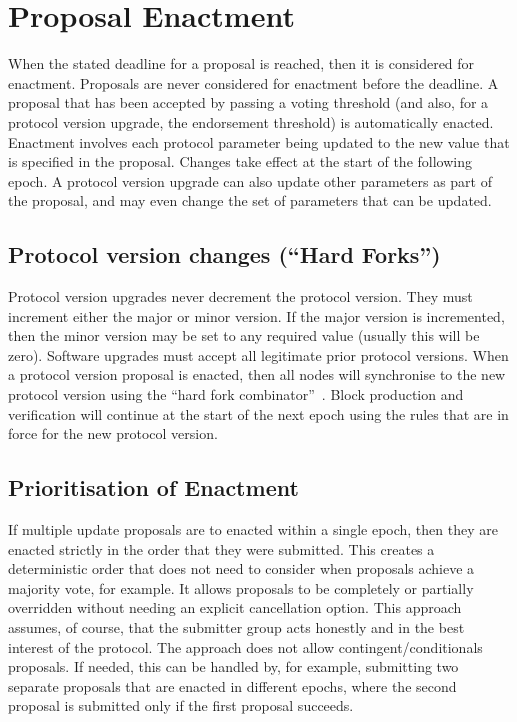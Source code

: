 \newpage
\section{Proposal Enactment}
\label{sect:enactment}

When the stated deadline for a proposal is reached, then it is considered for enactment.  Proposals are never considered for enactment
before the deadline.  A proposal that has been accepted by passing a voting threshold (and also, for a protocol version upgrade, the
endorsement threshold) is automatically enacted.  Enactment involves each protocol parameter being updated to the new value that is specified
in the proposal.  Changes take effect at the start of the following epoch.  A protocol version upgrade can also update other parameters as part of
the proposal, and may even change the set of parameters that can be updated.

\subsection{Protocol version changes (``Hard Forks'')}

Protocol version upgrades never decrement the protocol version.  They must increment either the major or minor version.  If the major version is
incremented, then the minor version may be set to any required value (usually this will be zero).  Software upgrades must accept all legitimate prior protocol versions.
When a protocol version proposal is enacted, then all nodes will synchronise to the new protocol version using the ``hard fork combinator''~\cite{hardfork-combinator}.
Block production and verification will continue at the start of the next epoch using the rules that are in force for the new protocol version.

\subsection{Prioritisation of Enactment}

If multiple update proposals are to enacted within a single epoch, then they are enacted strictly in the order that they were submitted.
This creates a deterministic order that does not need to consider when proposals achieve a majority vote, for example.
It allows proposals to be completely or partially overridden without needing an explicit cancellation option.
This approach assumes, of course, that the submitter group acts honestly and in the best interest of the protocol.
The approach does not allow contingent/conditionals proposals.  If needed, this can be handled by, for example, submitting two separate proposals that are enacted
in different epochs, where the second proposal is submitted only if the first proposal succeeds.

